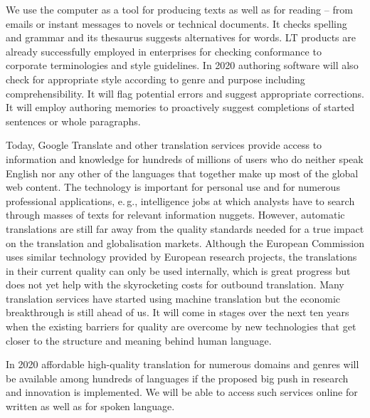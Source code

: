\documentclass[10pt, plain]{../../metanetpaper}
\begin{document}
\begin{multicols}{2}
 
We use the computer as a tool for producing texts as well as for reading -- from emails or instant messages to novels or technical documents. It checks spelling and grammar and its thesaurus suggests alternatives for words. LT products are already successfully employed in enterprises for checking conformance to corporate terminologies and style guidelines. In 2020 authoring software will also check for appropriate style according to genre and purpose including comprehensibility. It will flag potential errors and suggest appropriate corrections. It will employ authoring memories to proactively suggest completions of started sentences or whole paragraphs.
 
Today, Google Translate and other translation services provide access to information and knowledge for hundreds of millions of users who do neither speak English nor any other of the languages that together make up most of the global web content. The technology is important for personal use and for numerous professional applications, e.\,g., intelligence jobs at which analysts have to search through masses of texts for relevant information nuggets. However, automatic translations are still far away from the quality standards needed for a true impact on the translation and globalisation markets. Although the European Commission uses similar technology provided by European research projects, the translations in their current quality can only be used internally, which is great progress but does not yet help with the skyrocketing costs for outbound translation. Many translation services have started using machine translation but the economic breakthrough is still ahead of us. It will come in stages over the next ten years when the existing barriers for quality are overcome by new technologies that get closer to the structure and meaning behind human language.
 
In 2020 affordable high-quality translation for numerous domains and genres will be available among hundreds of languages if the proposed big push in research and innovation is implemented. We will be able to access such services online for written as well as for spoken language.
 

\end{multicols}
\end{document}
